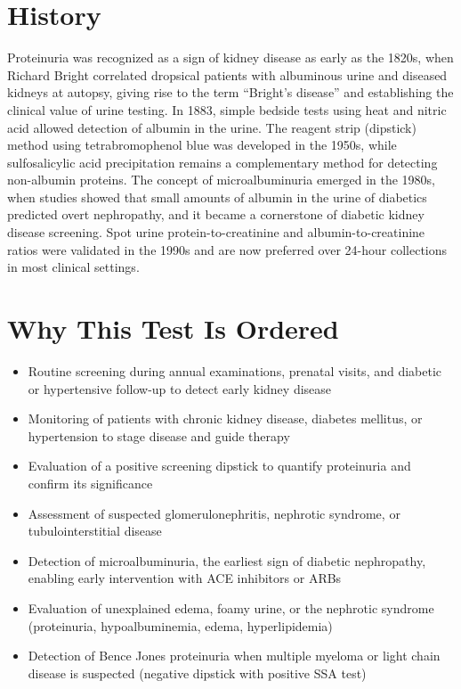 \section*{History}
Proteinuria was recognized as a sign of kidney disease as early as the 1820s, when Richard Bright correlated dropsical patients with albuminous urine and diseased kidneys at autopsy, giving rise to the term ``Bright's disease'' and establishing the clinical value of urine testing. In 1883, simple bedside tests using heat and nitric acid allowed detection of albumin in the urine. The reagent strip (dipstick) method using tetrabromophenol blue was developed in the 1950s, while sulfosalicylic acid precipitation remains a complementary method for detecting non-albumin proteins. The concept of microalbuminuria emerged in the 1980s, when studies showed that small amounts of albumin in the urine of diabetics predicted overt nephropathy, and it became a cornerstone of diabetic kidney disease screening. Spot urine protein-to-creatinine and albumin-to-creatinine ratios were validated in the 1990s and are now preferred over 24-hour collections in most clinical settings.
\section*{Why This Test Is Ordered}
\begin{itemize}
  \item Routine screening during annual examinations, prenatal visits, and diabetic or hypertensive follow-up to detect early kidney disease
  \item Monitoring of patients with chronic kidney disease, diabetes mellitus, or hypertension to stage disease and guide therapy
  \item Evaluation of a positive screening dipstick to quantify proteinuria and confirm its significance
  \item Assessment of suspected glomerulonephritis, nephrotic syndrome, or tubulointerstitial disease
  \item Detection of microalbuminuria, the earliest sign of diabetic nephropathy, enabling early intervention with ACE inhibitors or ARBs
  \item Evaluation of unexplained edema, foamy urine, or the nephrotic syndrome (proteinuria, hypoalbuminemia, edema, hyperlipidemia)
  \item Detection of Bence Jones proteinuria when multiple myeloma or light chain disease is suspected (negative dipstick with positive SSA test)
\end{itemize}
